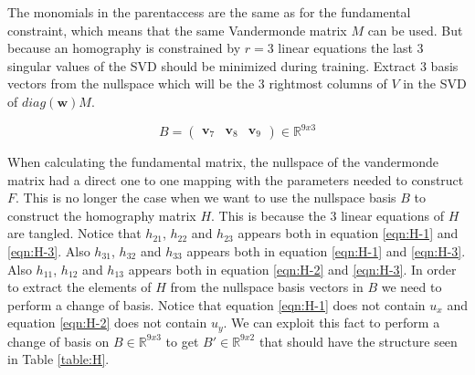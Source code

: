 The monomials in the parentaccess are the same as for the fundamental constraint, which means that the same Vandermonde matrix $M$ can be used. But because an homography is constrained by $r=3$ linear equations the last 3 singular values of the SVD should be minimized during training. Extract 3 basis vectors from the nullspace which will be the 3 rightmost columns of $ V $ in the SVD of $diag(\textbf{w})M$.

\[
B = 
\begin{pmatrix}
\textbf{v}_7 & \textbf{v}_8 & \textbf{v}_9
\end{pmatrix}
\in \mathbb{R}^{9x3}
\]

When calculating the fundamental matrix, the nullspace of the vandermonde matrix had a direct one to one mapping with the parameters needed to construct $F$. This is no longer the case when we want to use the nullspace basis $B$ to construct the homography matrix $H$. This is because the 3 linear equations of $H$ are tangled. Notice that $h_{21}$, $h_{22}$ and $h_{23}$ appears both in equation \ref{eqn:H-1} and \ref{eqn:H-3}. Also $h_{31}$, $h_{32}$ and $h_{33}$ appears both in equation \ref{eqn:H-1} and \ref{eqn:H-3}. Also $h_{11}$, $h_{12}$ and $h_{13}$ appears both in equation \ref{eqn:H-2} and \ref{eqn:H-3}. In order to extract the elements of $H$ from the nullspace basis vectors in $B$ we need to perform a change of basis.
Notice that equation \ref{eqn:H-1} does not contain $u_x$ and equation \ref{eqn:H-2} does not contain $u_y$. We can exploit this fact to perform a change of basis on $B \in \mathbb{R}^{9x3}$ to get $B' \in \mathbb{R}^{9x2}$ that should have the structure seen in Table \ref{table:H}.

